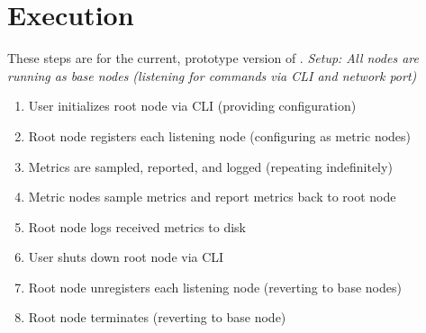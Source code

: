 \section{Execution}

These steps are for the current, prototype version of \dcamp. \textit{Setup: All nodes are running as base nodes
(listening for commands via CLI and network port)}

\begin{enumerate}

\item User initializes root node via CLI (providing configuration) 
\item Root node registers each listening node (configuring as metric nodes) 
\item Metrics are sampled, reported, and logged (repeating indefinitely) 
\item Metric nodes sample metrics and report metrics back to root node 
\item Root node logs received metrics to disk 
\item User shuts down root node via CLI 
\item Root node unregisters each listening node (reverting to base nodes) 
\item Root node terminates (reverting to base node)

\end{enumerate}

